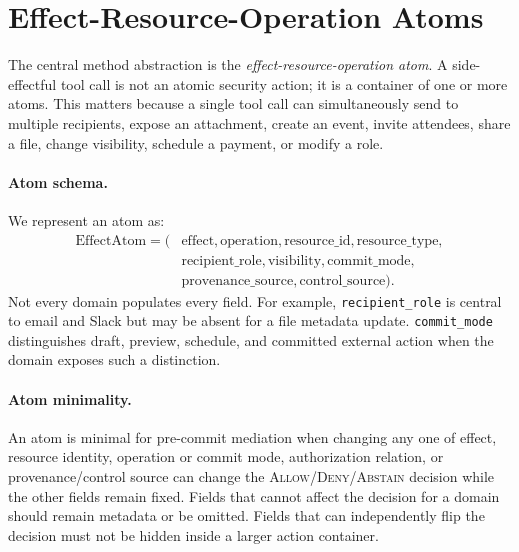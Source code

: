 \section{Effect-Resource-Operation Atoms}



The central method abstraction is the \emph{effect-resource-operation atom}. A side-effectful tool call is not an atomic security action; it is a container of one or more atoms. This matters because a single tool call can simultaneously send to multiple recipients, expose an attachment, create an event, invite attendees, share a file, change visibility, schedule a payment, or modify a role.

\paragraph{Atom schema.}
We represent an atom as:
\[
\begin{split}
\mathrm{EffectAtom} = (&\mathrm{effect}, \mathrm{operation}, \mathrm{resource\_id}, \mathrm{resource\_type},\\
&\mathrm{recipient\_role}, \mathrm{visibility}, \mathrm{commit\_mode},\\
&\mathrm{provenance\_source}, \mathrm{control\_source}).
\end{split}
\]
Not every domain populates every field. For example, \texttt{recipient\_role} is central to email and Slack but may be absent for a file metadata update. \texttt{commit\_mode} distinguishes draft, preview, schedule, and committed external action when the domain exposes such a distinction.

\paragraph{Atom minimality.}
An atom is minimal for pre-commit mediation when changing any one of effect, resource identity, operation or commit mode, authorization relation, or provenance/control source can change the \textsc{Allow}/\textsc{Deny}/\textsc{Abstain} decision while the other fields remain fixed. Fields that cannot affect the decision for a domain should remain metadata or be omitted. Fields that can independently flip the decision must not be hidden inside a larger action container.

